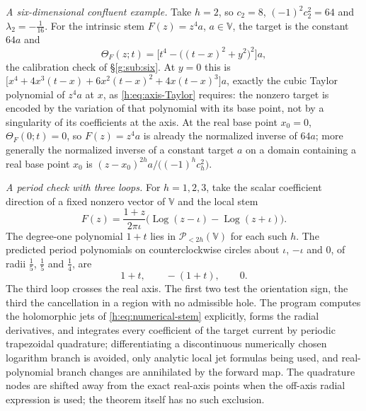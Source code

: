 \documentclass[11pt,a4paper]{article}
\numberwithin{equation}{section}
\theoremstyle{definition}
\theoremstyle{remark}
\theoremstyle{plain}
\newcommand{\VV}{\mathbb V}                       %
\newcommand{\PolH}{\mathscr P_{<2h}(\VV)}
\newcommand{\Herm}{\Theta}                        %
\begin{document}
\emph{A six-dimensional confluent example.} Take $h=2$, so $c_2=8$,
$(-1)^2c_2^2=64$ and $\lambda_2=-\tfrac1{16}$. For the intrinsic stem
$F(z)=z^4a$, $a\in\VV$, the target is the constant $64a$ and
\begin{equation}\label{h:eq:example-H}
 \Herm_F(z;t)=\bigl[t^4-\bigl((t-x)^2+y^2\bigr)^2\bigr]a ,
\end{equation}
the calibration check of \S\ref{g:sub:six}. At $y=0$ this is
$\bigl[x^4+4x^3(t-x)+6x^2(t-x)^2+4x(t-x)^3\bigr]a$, exactly the cubic Taylor
polynomial of $z^4a$ at $x$, as \eqref{h:eq:axis-Taylor} requires: the nonzero
target is encoded by the variation of that polynomial with its base point, not
by a singularity of its coefficients at the axis. At the real base point
$x_0=0$, $\Herm_F(0;t)=0$, so $F(z)=z^4a$ is already the normalized inverse of
$64a$; more generally the normalized inverse of a constant target $a$ on a
domain containing a real base point $x_0$ is $(z-x_0)^{2h}a/\bigl((-1)^hc_h^2\bigr)$.

\emph{A period check with three loops.} For $h=1,2,3$, take the scalar
coefficient direction of a fixed nonzero vector of $\VV$ and the local stem
\begin{equation}\label{h:eq:numerical-stem}
 F(z)=\frac{1+z}{2\pi\iota}\bigl(\operatorname{Log}(z-\iota)
 -\operatorname{Log}(z+\iota)\bigr).
\end{equation}
The degree-one polynomial $1+t$ lies in $\PolH$ for each such $h$. The
predicted period polynomials on counterclockwise circles about $\iota$,
$-\iota$ and $0$, of radii $\tfrac15$, $\tfrac15$ and $\tfrac14$, are
\begin{equation}\label{h:eq:test-periods}
 1+t,\qquad-(1+t),\qquad 0 .
\end{equation}
The third loop crosses the real axis. The first two test the orientation sign,
the third the cancellation in a region with no admissible hole. The program
computes the holomorphic jets of \eqref{h:eq:numerical-stem} explicitly, forms
the radial derivatives, and integrates every coefficient of the target current
by periodic trapezoidal quadrature; differentiating a discontinuous numerically
chosen logarithm branch is avoided, only analytic local jet formulas being
used, and real-polynomial branch changes are annihilated by the forward map.
The quadrature nodes are shifted away from the exact real-axis points when the
off-axis radial expression is used; the theorem itself has no such exclusion.
\end{document}
